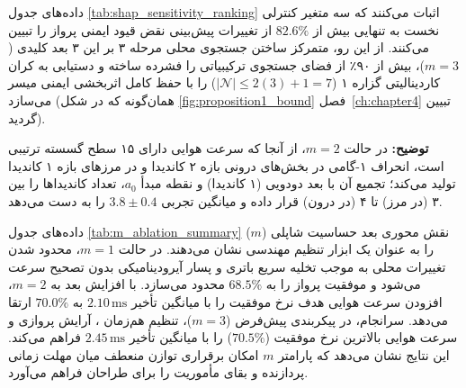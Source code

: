 \documentclass[oneside,openany,phd]{TMU-Thesis}
\begin{document}
داده‌های جدول \ref{tab:shap_sensitivity_ranking} اثبات می‌کنند که سه متغیر کنترلی نخست به تنهایی بیش از $82.6\%$ از تغییرات پیش‌بینی نقض قیود ایمنی پرواز را تبیین می‌کنند. از این رو، متمرکز ساختن جستجوی محلی مرحله ۳ بر این ۳ بعد کلیدی ($m=3$)، بیش از ۹۰٪ از فضای جستجوی ترکیبیاتی را فشرده ساخته و دستیابی به کران کاردینالیتی گزاره ۱ ($|\mathcal{N}| \le 2(3)+1 = 7$) را با حفظ کامل اثربخشی ایمنی میسر می‌سازد (همان‌گونه که در شکل \ref{fig:proposition1_bound} فصل~\ref{ch:chapter4} تبیین گردید).

\begin{table}[htbp]
\caption[تحلیل حساسیت بعد زیرفضای شاپلی در سازوکار \pgalr]{تحلیل حساسیت بعد زیرفضای حساسیت شاپلی ($m$) در سازوکار \pgalr در سطح رواداری سخت‌گیرانه $v_3$ در }
\label{tab:m_ablation_summary}
\centering
\small
{}
\smallskip
\parbox{\linewidth}{\scriptsize \textbf{توضیح:} در حالت $m=2$، از آنجا که سرعت هوایی دارای ۱۵ سطح گسسته ترتیبی است، انحراف ۱-گامی در بخش‌های درونی بازه ۲ کاندیدا و در مرزهای بازه ۱ کاندیدا تولید می‌کند؛ تجمیع آن با بعد دودویی  (۱ کاندیدا) و نقطه مبدأ $a_0$، تعداد کاندیداها را بین ۳ (در مرز) تا ۴ (در درون) قرار داده و میانگین تجربی $3.8 \pm 0.4$ را به دست می‌دهد.}
\end{table}

داده‌های جدول \ref{tab:m_ablation_summary} نقش محوری بعد حساسیت شاپلی ($m$) را به عنوان یک ابزار تنظیم مهندسی نشان می‌دهند. در حالت $m=1$، محدود شدن تغییرات محلی به  موجب تخلیه سریع باتری و پسار آیرودینامیکی بدون تصحیح سرعت می‌شود و موفقیت پرواز را به $68.5\%$ محدود می‌سازد. با افزایش بعد به $m=2$، افزودن سرعت هوایی هدف نرخ موفقیت را با میانگین تأخیر $2.10\,\text{ms}$ به $70.0\%$ ارتقا می‌دهد. سرانجام، در پیکربندی پیش‌فرض ($m=3$)، تنظیم هم‌زمان ، آرایش پروازی و سرعت هوایی بالاترین نرخ موفقیت ($\mathbf{70.5\%}$) را با میانگین تأخیر $2.45\,\text{ms}$ فراهم می‌کند. این نتایج نشان می‌دهد که پارامتر $m$ امکان برقراری توازن منعطف میان مهلت زمانی پردازنده و بقای مأموریت را برای طراحان فراهم می‌آورد.
\end{document}
